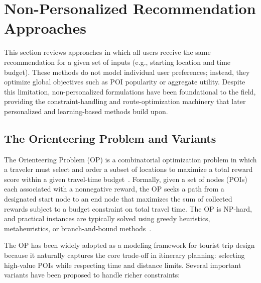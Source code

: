 

\section{Non-Personalized Recommendation Approaches}
\label{sec:sota-nonpers}

This section reviews approaches in which all users receive the same recommendation for a given set of inputs (e.g., starting location and time budget). These methods do not model individual user preferences; instead, they optimize global objectives such as POI popularity or aggregate utility. Despite this limitation, non-personalized formulations have been foundational to the field, providing the constraint-handling and route-optimization machinery that later personalized and learning-based methods build upon.



\subsection{The Orienteering Problem and Variants}
\label{sec:sota-nonpers-op}

The Orienteering Problem (OP) is a combinatorial optimization problem in which a traveler must select and order a subset of locations to maximize a total reward score within a given travel-time budget~\cite{vansteenwegen2011op}. Formally, given a set of nodes (POIs) each associated with a nonnegative reward, the OP seeks a path from a designated start node to an end node that maximizes the sum of collected rewards subject to a budget constraint on total travel time. The OP is NP-hard, and practical instances are typically solved using greedy heuristics, metaheuristics, or branch-and-bound methods~\cite{vansteenwegen2011op, gunawan2016op}.

The OP has been widely adopted as a modeling framework for tourist trip design because it naturally captures the core trade-off in itinerary planning: selecting high-value POIs while respecting time and distance limits. Several important variants have been proposed to handle richer constraints:

